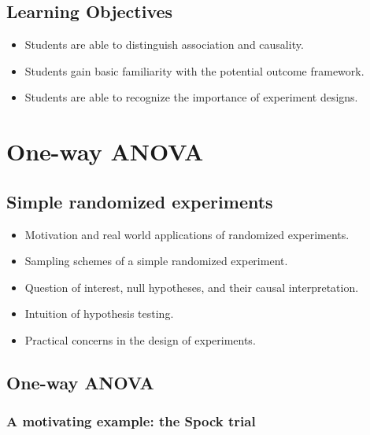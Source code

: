 \documentclass[12pt,]{book}
\providecommand{\tightlist}{%
  \setlength{\itemsep}{0pt}\setlength{\parskip}{0pt}}
\begin{document}
\section{Learning Objectives}\label{learning-objectives}

\begin{itemize}
\tightlist
\item
  Students are able to distinguish association and causality.
\item
  Students gain basic familiarity with the potential outcome framework.
\item
  Students are able to recognize the importance of experiment designs.
\end{itemize}

\chapter{One-way ANOVA}\label{ch:anovaI}

\section{Simple randomized
experiments}\label{simple-randomized-experiments}

\begin{itemize}
\tightlist
\item
  Motivation and real world applications of randomized experiments.
\item
  Sampling schemes of a simple randomized experiment.
\item
  Question of interest, null hypotheses, and their causal
  interpretation.
\item
  Intuition of hypothesis testing.
\item
  Practical concerns in the design of experiments.
\end{itemize}

\section{One-way ANOVA}\label{one-way-anova}

\subsection{A motivating example: the Spock
trial}\label{a-motivating-example-the-spock-trial}
\end{document}
